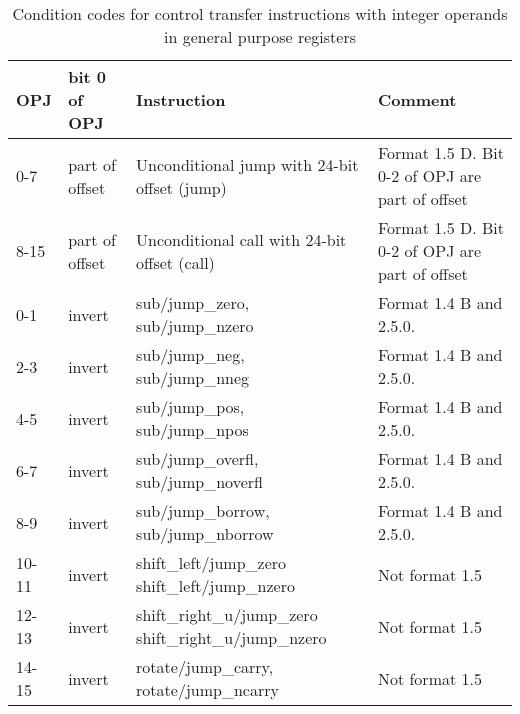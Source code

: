 \documentclass[forwardcom.tex]{subfiles}
\begin{document}
\begin{longtable}
{|p{12mm}|p{16mm}|p{60mm}|p{55mm}|}
\caption{Condition codes for control transfer instructions with integer operands in general purpose registers }
\label{table:controlTransferInstructions}
\endfirsthead
\endhead
\hline
OPJ & bit 0 \newline of OPJ & Instruction & Comment \\
\hline
0-7 & part of offset & Unconditional jump with 24-bit offset (jump) & Format 1.5 D. Bit 0-2 of OPJ are part of offset \\
\hline
8-15 & part of offset & Unconditional call with 24-bit offset (call) & Format 1.5 D.  Bit 0-2 of OPJ are part of offset \\
\hline
0-1 & invert & sub/jump\_zero, \newline sub/jump\_nzero & Format 1.4 B and 2.5.0. \\
\hline
2-3 & invert & sub/jump\_neg, \newline sub/jump\_nneg & Format 1.4 B and 2.5.0.  \\
\hline
4-5 & invert & sub/jump\_pos, \newline sub/jump\_npos & Format 1.4 B and 2.5.0.  \\
\hline
6-7 & invert & sub/jump\_overfl, \newline sub/jump\_noverfl & Format 1.4 B and 2.5.0.  \\
\hline
8-9 & invert & sub/jump\_borrow, \newline sub/jump\_nborrow & Format 1.4 B and 2.5.0. \\
\hline
10-11 & invert & shift\_left/jump\_zero \newline shift\_left/jump\_nzero & Not format 1.5 \\
\hline
12-13 & invert & shift\_right\_u/jump\_zero \newline shift\_right\_u/jump\_nzero & Not format 1.5 \\
\hline
14-15 & invert & rotate/jump\_carry, \newline rotate/jump\_ncarry & Not format 1.5 \\
\hline


\end{longtable}
\end{document}
